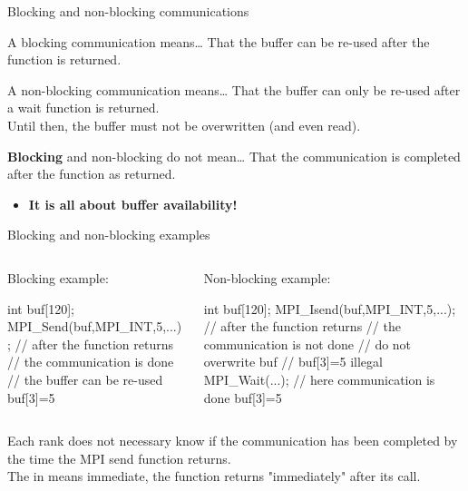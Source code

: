 \documentclass[aspectratio=43]{beamer}
\begin{document}
\begin{frame}{Blocking and non-blocking communications}
\begin{green1block}{A blocking communication means\ldots}
    That the buffer can be re-used after the function is returned.
\end{green1block}
\begin{green1block}{A non-blocking communication means\ldots}
    That the buffer can only be re-used after a wait function is returned.\\
    Until then, the buffer must not be overwritten (and even read).
\end{green1block}
\begin{red1block}{\textbf{Blocking} and non-blocking do not mean\ldots}
    That the communication is completed after the function as returned.
\end{red1block}
\begin{itemize}
    \item<2>[\color{cscsred}$\Rightarrow$]\color{cscsred}\textbf{It is all about buffer availability!}
\end{itemize}
\end{frame}


\begin{frame}[fragile]{Blocking and non-blocking examples}
    \begin{columns}
        \begin{column}{0.45\paperwidth}
            Blocking example:
\begin{Pseudolisting}[]{}
int buf[120];
MPI_Send(buf,MPI_INT,5,...);
// after the function returns
// the communication is done
// the buffer can be re-used
buf[3]=5
\end{Pseudolisting}
        \end{column}
        \begin{column}{0.45\paperwidth}
            Non-blocking example:
\begin{Pseudolisting}[]{}
int buf[120];
MPI_Isend(buf,MPI_INT,5,...);
// after the function returns
// the communication is not done
// do not overwrite buf
// buf[3]=5 illegal
MPI_Wait(...);
// here communication is done
buf[3]=5
\end{Pseudolisting}
        \end{column}
    \end{columns}
Each rank does not necessary know if the communication has been completed by the time the MPI send function returns.\\
The  in  means {\color{cscsred}immediate}, the function returns "immediately" after its call.
\end{frame}
\end{document}
